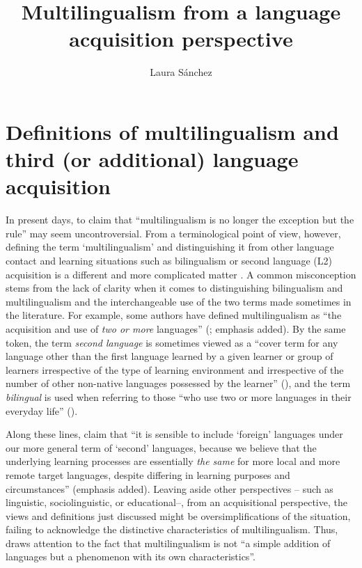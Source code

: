 \documentclass[output=paper,colorlinks,citecolor=brown,nonflat]{../langscibook}
\author{Laura Sánchez\affiliation{Stockholms universitet}}
\title{Multilingualism from a language acquisition perspective}
\begin{document}
\maketitle



\section{Definitions of multilingualism and third (or additional) language acquisition}\label{sec:sanchez1:1}

In present days, to claim that “multilingualism is no longer the exception but the rule” \citep[113]{Sánchez2019CLIL} may seem uncontroversial. From a terminological point of view, however, defining the term ‘multilingualism’ and distinguishing it from other language contact and learning situations such as bilingualism or second language (L2) acquisition is a different and more complicated matter \citep{Cenoz2013}. A common misconception stems from the lack of clarity when it comes to distinguishing bilingualism and multilingualism and the interchangeable use of the two terms made sometimes in the literature. For example, some authors have defined multilingualism as “the acquisition and use of \textit{two or more} languages” (\citealt[2]{AroninSingleton2008}; emphasis added). By the same token, the term \textit{second language} is sometimes viewed as a “cover term for any language other than the first language learned by a given learner or group of learners irrespective of the type of learning environment and irrespective of the number of other non-native languages possessed by the learner” (\citealt[7]{SharwoodSmith1994}), and the term \textit{bilingual} is used when referring to those “who use two or more languages in their everyday life” (\citealt[xiii]{Grosjean2010}).

Along these lines, \citet[2]{MitchellMyles1998} claim that “it is sensible to include ‘foreign’ languages under our more general term of ‘second’ languages, because we believe that the underlying learning processes are essentially \textit{the same} for more local and more remote target languages, despite differing in learning purposes and circumstances” (emphasis added). Leaving aside other perspectives – such as linguistic, sociolinguistic, or educational–, from an acquisitional perspective, the views and definitions just discussed might be oversimplifications of the situation, failing to acknowledge the distinctive characteristics of multilingualism. Thus, \citet[14]{Cenoz2013} draws attention to the fact that multilingualism is not “a simple addition of languages but a phenomenon with its own characteristics”.
\end{document}

